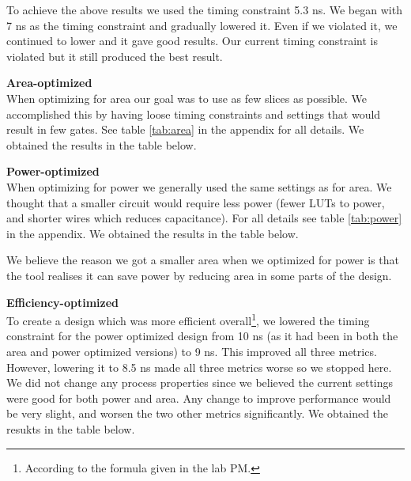 \documentclass[a4paper,11pt]{article}
\begin{document}
To achieve the above results we used the timing constraint 5.3 ns. We began with 7 ns as the timing constraint and gradually lowered it. Even if we violated it, we continued to lower and it gave good results. Our current timing constraint is violated but it still produced the best result.

\textbf{Area-optimized}\\
When optimizing for area our goal was to use as few slices as possible. We accomplished this by having loose timing constraints and settings that would result in few gates. See table \ref{tab:area} in the appendix for all details. We obtained the results in the table below.


\textbf{Power-optimized}\\
When optimizing for power we generally used the same settings as for area. We thought that a smaller circuit would require less power (fewer LUTs to power, and shorter wires which reduces capacitance). For all details see table \ref{tab:power} in the appendix. We obtained the results in the table below.


We believe the reason we got a smaller area when we optimized for power is that the tool realises it can save power by reducing area in some parts of the design. 

\textbf{Efficiency-optimized}\\
To create a design which was more efficient overall\footnote{According to the formula given in the lab PM.}, we lowered the timing constraint for the power optimized design from 10 ns (as it had been in both the area and power optimized versions) to 9 ns. This improved all three metrics. However, lowering it to 8.5 ns made all three metrics worse so we stopped here. We did not change any process properties since we believed the current settings were good for both power and area. Any change to improve performance would be very slight, and worsen the two other metrics significantly. We obtained the resukts in the table below.
\end{document}
